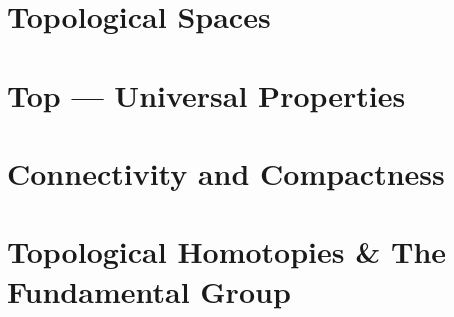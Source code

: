 \documentclass[../../../deep-dive]{subfiles}
\begin{document}
\chapter{Topological Spaces}









\chapter{\textbf{Top} --- Universal Properties}





\chapter{Connectivity and Compactness}



\chapter{Topological Homotopies \& The Fundamental Group}


\end{document}

